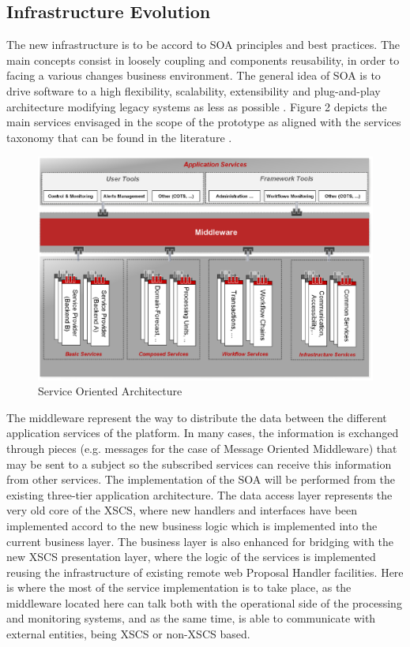 \subsection{Infrastructure Evolution}
The new infrastructure is to be accord to SOA principles and best practices. The main concepts consist in loosely coupling and components reusability, in order to facing a various changes business environment.  
The general idea of SOA is to drive software to a high flexibility, scalability, extensibility and plug-and-play architecture modifying legacy systems as less as possible \cite{soa1}.
Figure 2 depicts the main services envisaged in the scope of the prototype as aligned with the services taxonomy that can be found in the literature \cite{soa2}.
\begin{figure}[h]
\centering
\includegraphics[width=80 mm]{part10/Perez_P022/P022_f2.eps}
\caption{Service Oriented Architecture}
\end{figure}
The middleware represent the way to distribute the data between the different application services of the platform. In many cases, the information is exchanged through pieces (e.g. messages for the case of Message Oriented Middleware) that may be sent to a subject so the subscribed services can receive this information from other services. The implementation of the SOA will be performed from the existing three-tier application architecture. The data access layer represents the very old core of the XSCS, where new handlers and interfaces have been implemented accord to the new business logic which is implemented into the current business layer. The business layer is also enhanced for bridging with the new XSCS presentation layer, where the logic of the services is implemented reusing the infrastructure of existing remote web Proposal Handler facilities. Here is where the most of the service implementation is to take place, as the middleware located here can talk both with the operational side of the processing and monitoring systems, and as the same time, is able to communicate with external entities, being XSCS or non-XSCS based.
